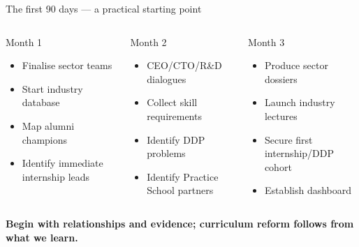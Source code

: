 \documentclass[aspectratio=169,11pt]{beamer}
\newcommand{\key}[1]{\textbf{\color{IITblue}#1}}
\begin{document}
\begin{frame}{The first 90 days — a practical starting point}
\begin{columns}[T]
\begin{block}{Month 1}
\begin{itemize}
\item Finalise sector teams
\item Start industry database
\item Map alumni champions
\item Identify immediate internship leads
\end{itemize}
\end{block}
\begin{block}{Month 2}
\begin{itemize}
\item CEO/CTO/R\&D dialogues
\item Collect skill requirements
\item Identify DDP problems
\item Identify Practice School partners
\end{itemize}
\end{block}
\begin{block}{Month 3}
\begin{itemize}
\item Produce sector dossiers
\item Launch industry lectures
\item Secure first internship/DDP cohort
\item Establish dashboard
\end{itemize}
\end{block}
\end{columns}
\vspace{5mm}
\centering\key{Begin with relationships and evidence; curriculum reform follows from what we learn.}
\end{frame}
\end{document}
